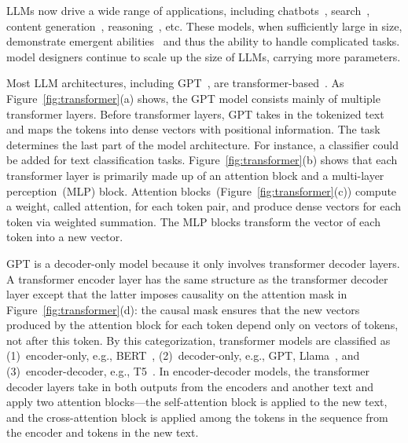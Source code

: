 LLMs now drive a wide range of applications, including chatbots~\cite{openaiChatGPT2022}, search~\cite{BingChatMicrosoft2023}, content generation~\cite{midjourneyMidjourney2022}, reasoning~\cite{langchainLangChain2022}, etc. These models, when sufficiently large in size, demonstrate emergent abilities~\cite{weiEmergentAbilitiesLarge2022} and thus the ability to handle complicated tasks.  model designers  continue to scale up the size of LLMs, carrying more parameters. %


Most LLM architectures, including GPT~\cite{radfordLanguageModelsAre2019},  are transformer-based~\cite{vaswaniAttentionAllYou2017}. As Figure~\ref{fig:transformer}(a) shows, the GPT model consists mainly of multiple transformer layers. Before transformer layers, GPT takes in the tokenized text and maps the tokens into dense vectors with positional information. The task determines the last part of the model architecture.
For instance, a classifier could be added for text classification tasks.
Figure~\ref{fig:transformer}(b) shows that each transformer layer is primarily made up of an attention block and a multi-layer perception~(MLP) block. Attention blocks~(Figure~\ref{fig:transformer}(c)) compute a weight, called attention, for each token pair, and produce dense vectors for each token via weighted summation. The MLP blocks transform the vector of each token into a new vector.




GPT is a decoder-only model because it only involves transformer decoder layers. A transformer encoder layer has the same structure as the transformer decoder layer except that the latter imposes causality on the attention mask in Figure~\ref{fig:transformer}(d): the causal mask ensures that the new vectors produced by the attention block for each token depend only on vectors of tokens, not after this token. By this categorization, transformer models are classified as (1)~encoder-only, e.g., BERT~\cite{devlinBERTPretrainingDeep2019}, (2)~decoder-only, e.g., GPT, Llama~\cite{touvronLlamaOpenFoundation2023}, and (3)~encoder-decoder, e.g., T5~\cite{raffelExploringLimitsTransfer2023}. In encoder-decoder models, the transformer decoder layers take in both outputs from the encoders and another text and apply two attention blocks---the self-attention block is applied to the new text, and the cross-attention block is applied among the tokens in the sequence from the encoder and tokens in the new text. 


